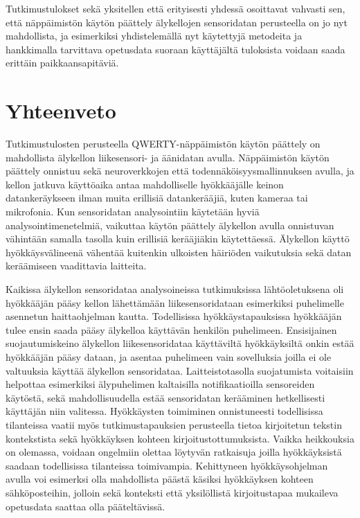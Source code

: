 \documentclass[finnish]{tktltiki2}
\theoremstyle{definition}
\theoremstyle{remark}
\begin{document}
Tutkimustulokset sekä yksitellen että erityisesti yhdessä osoittavat vahvasti sen, että näppäimistön käytön päättely älykellojen sensoridatan perusteella on jo nyt mahdollista, ja esimerkiksi yhdistelemällä nyt käytettyjä metodeita ja hankkimalla tarvittava opetusdata suoraan käyttäjältä tuloksista voidaan saada erittäin paikkaansapitäviä.

\section{Yhteenveto}

Tutkimustulosten perusteella QWERTY-näppäimistön käytön päättely on mahdollista älykellon liikesensori- ja äänidatan avulla. Näppäimistön käytön päättely onnistuu sekä neuroverkkojen että todennäköisyysmallinnuksen avulla, ja kellon jatkuva käyttöaika antaa mahdolliselle hyökkääjälle keinon datankeräykseen ilman muita erillisiä datankerääjiä, kuten kameraa tai mikrofonia. Kun sensoridatan analysointiin käytetään hyviä analysointimenetelmiä, vaikuttaa käytön päättely älykellon avulla onnistuvan vähintään samalla tasolla kuin erillisiä kerääjiäkin käytettäessä. Älykellon käyttö hyökkäysvälineenä vähentää kuitenkin ulkoisten häiriöden vaikutuksia sekä datan keräämiseen vaadittavia laitteita. 

Kaikissa älykellon sensoridataa analysoineissa tutkimuksissa lähtöoletuksena oli hyökkääjän pääsy kellon lähettämään liikesensoridataan esimerkiksi puhelimelle asennetun haittaohjelman kautta. Todellisissa hyökkäystapauksissa hyökkääjän tulee ensin saada pääsy älykelloa käyttävän henkilön puhelimeen. Ensisijainen suojautumiskeino älykellon liikesensoridataa käyttäviltä hyökkäyksiltä onkin estää hyökkääjän pääsy dataan, ja asentaa puhelimeen vain sovelluksia joilla ei ole valtuuksia käyttää älykellon sensoridataa. 
Laitteistotasolla suojatumista voitaisiin helpottaa esimerkiksi älypuhelimen kaltaisilla notifikaatioilla sensoreiden käytöstä, sekä mahdollisuudella estää sensoridatan kerääminen hetkellisesti käyttäjän niin valitessa. Hyökkäysten toimiminen onnistuneesti todellisissa tilanteissa vaatii myös tutkimustapauksien perusteella tietoa kirjoitetun tekstin kontekstista sekä hyökkäyksen kohteen kirjoitustottumuksista. Vaikka heikkouksia on olemassa, voidaan ongelmiin olettaa löytyvän ratkaisuja joilla hyökkäyksistä saadaan todellisissa tilanteissa toimivampia. Kehittyneen hyökkäysohjelman avulla voi esimerksi olla mahdollista päästä käsiksi hyökkäyksen kohteen sähköposteihin, jolloin sekä konteksti että yksilöllistä kirjoitustapaa mukaileva opetusdata saattaa olla pääteltävissä.
\end{document}
